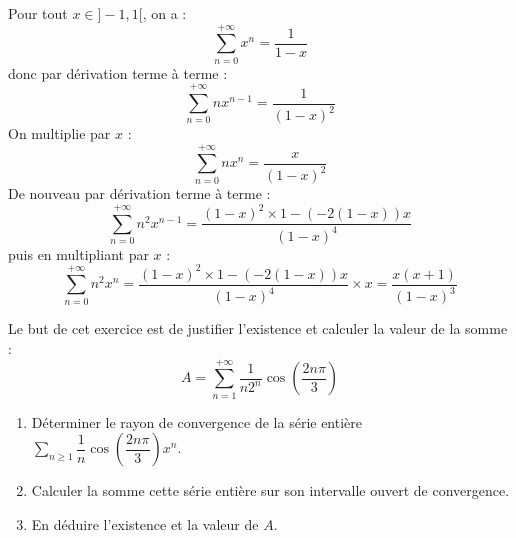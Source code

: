 \documentclass[a4paper,10pt]{report}
\newcommand{\Sum}[2]{\ensuremath{\textstyle{\sum\limits_{#1}^{#2}}}}
\begin{document}
\medskip

\noindent Pour tout $x \in ]-1,1[$, on a :
$$ \sum_{n=0}^{+\infty}x^n  =  \dfrac{1}{1-x} $$
donc par dérivation terme à terme :
$$ \sum_{n=0}^{+\infty} nx^{n-1}  =  \dfrac{1}{(1-x)^2} $$
On multiplie par $x$ :
$$ \sum_{n=0}^{+\infty} nx^{n}  =  \dfrac{x}{(1-x)^2} $$
De nouveau par dérivation terme à terme :
$$ \sum_{n=0}^{+\infty} n^2 x^{n-1} = \dfrac{(1-x)^2\times 1-(-2(1-x))x}{(1-x)^4}$$
puis en multipliant par $x$ :
$$ \sum_{n=0}^{+\infty} n^2 x^{n}= \dfrac{(1-x)^2\times 1-(-2(1-x))x}{(1-x)^4} \times x  = \dfrac{x(x+1)}{(1-x)^3}$$

\begin{Exercice}{} Le but de cet exercice est de justifier l'existence et calculer la valeur de la somme :  
\[
A=\sum_{n=1}^{+\infty}\dfrac{1}{n2^n}\cos\left(\dfrac{2n\pi}{3}\right)
\]
\begin{enumerate}
\item Déterminer le rayon de convergence de la série entière $\Sum{n \geq 1}{} \dfrac{1}{n}\cos\left(\dfrac{2n\pi}{3}\right)x^n$.
\item Calculer la somme cette série entière sur son intervalle ouvert de convergence.
\item En déduire l'existence et la valeur de $A$.
\end{enumerate}
\end{Exercice}

\corr 
\end{document}

